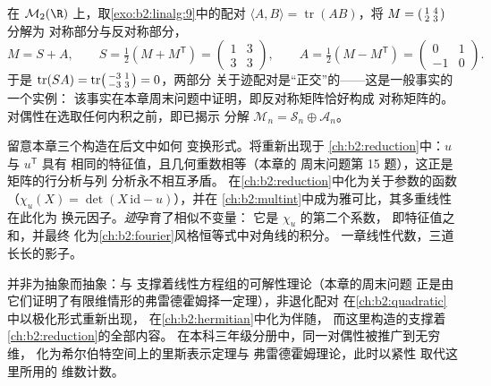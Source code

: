 \begin{example}[迹配对分解矩阵空间]\label{ex:b2:linalg:tracepairing}
在 $\mathcal{M}_2(\R)$ 上，取\cref{exo:b2:linalg:9}中的配对 $\langle A, B\rangle =
\operatorname{tr}(AB)$，将 $M =
\begin{psmallmatrix}1 & 4\\ 2 & 3\end{psmallmatrix}$ 分解为
对称部分与反对称部分，
\[
M = S + A, \qquad
S = \tfrac12(M + M^{\mathsf T}) =
\begin{pmatrix}1 & 3\\ 3 & 3\end{pmatrix},
\qquad
A = \tfrac12(M - M^{\mathsf T}) =
\begin{pmatrix}0 & 1\\ -1 & 0\end{pmatrix}.
\]
于是 $\operatorname{tr}(SA) = \operatorname{tr}
\begin{psmallmatrix}-3 & 1\\ -3 & 3\end{psmallmatrix} = 0$，两部分
关于迹配对是“正交”的——这是一般事实的一个实例：
该事实在本章周末问题中证明，即反对称矩阵恰好构成
对称矩阵的。
对偶性在选取任何内积之前，即已揭示
分解 $\mathcal{M}_n = \mathcal{S}_n \oplus
\mathcal{A}_n$。
\end{example}

\begin{remark}[本卷中的几种视角]\label{rem:b2:linalg:perspectives}
留意本章三个构造在后文中如何
变换形式。\emph{}将重新出现于
\cref{ch:b2:reduction}中：$u$ 与 $u^{\mathsf T}$ 具有
相同的特征值，且几何重数相等（本章的
周末问题第 15 题），这正是矩阵的行分析与列
分析永不相互矛盾。\emph{}
在\cref{ch:b2:reduction}中化为关于参数的函数
（$\chi_u(X) = \det(X\,\mathrm{id} - u)$），并在
\cref{ch:b2:multint}中成为雅可比，其多重线性在此化为
换元因子。\emph{迹}孕育了相似不变量：
它是 $\chi_u$ 的第二个系数，
即特征值之和，并最终
化为\cref{ch:b2:fourier}风格恒等式中对角线的积分。
一章线性代数，三道长长的影子。
\end{remark}

\begin{remark}[本章的应用]
并非为抽象而抽象：与
支撑着线性方程组的可解性理论（本章的周末问题
正是由它们证明了有限维情形的弗雷德霍姆择一定理），非退化配对
在\cref{ch:b2:quadratic}中以极化形式重新出现，
在\cref{ch:b2:hermitian}中化为伴随，
而这里构造的支撑着\cref{ch:b2:reduction}的全部内容。
在本科三年级分册中，同一对偶性被推广到无穷维，
化为希尔伯特空间上的里斯表示定理与
弗雷德霍姆理论，此时以紧性
取代这里所用的
维数计数。
\end{remark}


